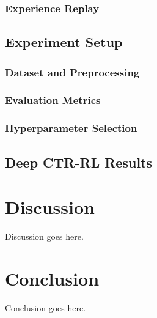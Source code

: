 \documentclass{mldsmsc}
\begin{document}
\subsection{Experience Replay}

\section{Experiment Setup}

\subsection{Dataset and Preprocessing}

\subsection{Evaluation Metrics}

\subsection{Hyperparameter Selection}

\section{Deep CTR-RL Results}

\chapter{Discussion}
\label{chap:discussion}

Discussion goes here.

\chapter{Conclusion}


Conclusion goes here. 





\clearpage
\renewcommand*{\thepage}{A\arabic{page}}

%
%




\end{document}
